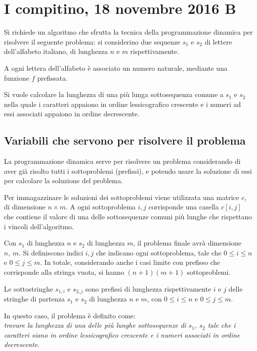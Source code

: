\documentclass{article}
\begin{document}
\section{I compitino, 18 novembre 2016 B}
Si richiede un algoritmo che sfrutta la tecnica della programmazione dinamica per risolvere il seguente problema: si considerino due sequenze $s_1$ e $s_2$ di lettere dell'alfabeto italiano, di lunghezza $n$ e $m$ rispettivamente. 

A ogni lettera dell'alfabeto è associato un numero naturale, mediante una funzione $f$ prefissata.

Si vuole calcolare la lunghezza di una più lunga sottosequenza comune a $s_1$ e $s_2$ nella quale i caratteri appaiono in ordine lessicografico crescente e i numeri ad essi associati appaiono in ordine decrescente.

\subsection{Variabili che servono per risolvere il problema}
La programmazione dinamica serve per risolvere un problema considerando di aver già risolto tutti i sottoproblemi (prefissi), e potendo usare la soluzione di essi per calcolare la soluzione del problema.

Per immagazzinare le soluzioni dei sottoproblemi viene utilizzata una matrice $c$, di dimensione $n \times m$. A ogni sottoproblema $i, j$ corrisponde una casella $c[i, j]$ che contiene il valore di una delle sottosequenze comuni più lunghe che rispettano i vincoli dell'algoritmo.

Con $s_1$ di lunghezza $n$ e $s_2$ di lunghezza $m$, il problema finale avrà dimensione $n,\ m$. Si definiscono indici $i, j$ che indicano ogni sottoproblema, tale che $0 \leq i \leq n$ e $0 \leq j \leq m$. In totale, considerando anche i casi limite con prefisso che corrisponde alla stringa vuota, si hanno $(n + 1)(m + 1)$ sottoproblemi.

Le sottostringhe $s_{1, i}$ e $s_{2, j}$ sono prefissi di lunghezza rispettivamente $i$ e $j$ delle stringhe di partenza $s_1$ e $s_2$ di lunghezza $n$ e $m$, con $0 \leq i \leq n$ e $0 \leq j \leq m$.

In questo caso, il problema è definito come: \\
\textit{trovare la lunghezza di una delle più lunghe sottosequenze di $s_1$, $s_2$ tale che i caratteri siano in ordine lessicografico crescente e i numeri associati in ordine decrescente}.
\end{document}

